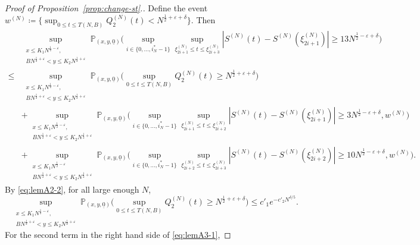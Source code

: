 \documentclass[11pt, reqno]{article}
\numberwithin{equation}{section}
\numberwithin{theorem}{section}
\begin{document}
\begin{appendix}
\begin{proof}[Proof of Proposition~\ref{prop:change-st}.]
Define the event $w^{(N)}\coloneqq\big\{\sup_{0\leq t\leq T(N,B)} Q^{(N)}_2(t)<N^{\frac{1}{2}+\varepsilon+\delta}\big\}$. Then
\begin{equation}\label{eq:lemA3-1}
    \begin{split}
   & \sup_{\substack{x\leq K_1N^{\frac{1}{2} - \varepsilon},\\ BN^{\frac{1}{2} + \varepsilon} <y\leq K_2N^{\frac{1}{2} + \varepsilon}}}\mathbb{P}_{(x,y, \underline{0})}\Big(\sup_{i\in \{0,...,i^*_N-1\}}\sup_{\xi^{(N)}_{2i+1}\leq t\leq \xi^{(N)}_{2i+3}}\left|S^{(N)}(t)-S^{(N)}(\xi^{(N)}_{2i+1})\right|\geq 13 N^{\frac{1}{2}-\varepsilon+\delta} \Big)\\
    \leq & \sup_{\substack{x\leq K_1N^{\frac{1}{2} - \varepsilon},\\ BN^{\frac{1}{2} + \varepsilon} <y\leq K_2N^{\frac{1}{2} + \varepsilon}}}\mathbb{P}_{(x,y,\underline{0})}\Big(\sup_{0\leq t\leq T(N,B)} Q^{(N)}_2(t)\geq N^{\frac{1}{2}+\varepsilon+\delta}\Big)\\
    &+\sup_{\substack{x\leq K_1N^{\frac{1}{2} - \varepsilon},\\ BN^{\frac{1}{2} + \varepsilon} <y\leq K_2N^{\frac{1}{2} + \varepsilon}}}\mathbb{P}_{(x,y, \underline{0})}\Big(\sup_{i\in \{0,...,i^*_N-1\}}\sup_{\xi^{(N)}_{2i+1}\leq t\leq \xi^{(N)}_{2i+2}}\left|S^{(N)}(t)-S^{(N)}(\xi^{(N)}_{2i+1})\right|\geq 3N^{\frac{1}{2}-\varepsilon+\delta},w^{(N)}\Big)\\
    &+\sup_{\substack{x\leq K_1N^{\frac{1}{2} - \varepsilon}\\ BN^{\frac{1}{2} + \varepsilon} <y\leq K_2N^{\frac{1}{2} + \varepsilon}}}\mathbb{P}_{(x,y, \underline{0})}\Big(\sup_{i\in \{0,...,i^*_N-1\}}\sup_{\xi^{(N)}_{2i+2}\leq t\leq \xi^{(N)}_{2i+3}}\left|S^{(N)}(t)-S^{(N)}(\xi^{(N)}_{2i+2})\right|\geq 10 N^{\frac{1}{2}-\varepsilon+\delta},w^{(N)}\Big).
    \end{split}
\end{equation}
By \eqref{eq:lemA2-2}, for all large enough $N$, 
\begin{equation}\label{eq:lemA3-2}
    \sup_{\substack{x\leq K_1N^{\frac{1}{2} - \varepsilon},\\ BN^{\frac{1}{2} + \varepsilon} <y\leq K_2N^{\frac{1}{2} + \varepsilon}}}\mathbb{P}_{(x,y,\underline{0})}\Big(\sup_{0\leq t\leq T(N,B)} Q^{(N)}_2(t)\geq N^{\frac{1}{2}+\varepsilon+\delta}\Big)
     \leq c'_1e^{-c'_2N^{\delta/5}}.
\end{equation}
For the second term in the right hand side of \eqref{eq:lemA3-1},

\end{proof}
\end{appendix}
\end{document}
